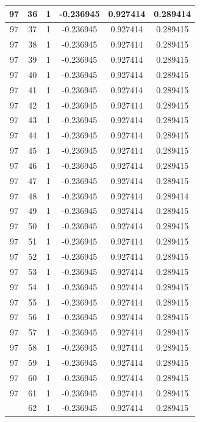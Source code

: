 \documentclass[12pt,a4paper]{article}
\numberwithin{equation}{section}
\numberwithin{figure}{section}
\numberwithin{table}{section}
\begin{document}
\begin{longtable}{|c|c|c|c|c|c|}
97 & 36 & 1 & -0.236945 & 0.927414 & 0.289414 \\ \hline
97 & 37 & 1 & -0.236945 & 0.927414 & 0.289415 \\ \hline
97 & 38 & 1 & -0.236945 & 0.927414 & 0.289415 \\ \hline
97 & 39 & 1 & -0.236945 & 0.927414 & 0.289415 \\ \hline
97 & 40 & 1 & -0.236945 & 0.927414 & 0.289415 \\ \hline
97 & 41 & 1 & -0.236945 & 0.927414 & 0.289415 \\ \hline
97 & 42 & 1 & -0.236945 & 0.927414 & 0.289415 \\ \hline
97 & 43 & 1 & -0.236945 & 0.927414 & 0.289415 \\ \hline
97 & 44 & 1 & -0.236945 & 0.927414 & 0.289415 \\ \hline
97 & 45 & 1 & -0.236945 & 0.927414 & 0.289415 \\ \hline
97 & 46 & 1 & -0.236945 & 0.927414 & 0.289415 \\ \hline
97 & 47 & 1 & -0.236945 & 0.927414 & 0.289415 \\ \hline
97 & 48 & 1 & -0.236945 & 0.927414 & 0.289414 \\ \hline
97 & 49 & 1 & -0.236945 & 0.927414 & 0.289415 \\ \hline
97 & 50 & 1 & -0.236945 & 0.927414 & 0.289415 \\ \hline
97 & 51 & 1 & -0.236945 & 0.927414 & 0.289415 \\ \hline
97 & 52 & 1 & -0.236945 & 0.927414 & 0.289415 \\ \hline
97 & 53 & 1 & -0.236945 & 0.927414 & 0.289415 \\ \hline
97 & 54 & 1 & -0.236945 & 0.927414 & 0.289415 \\ \hline
97 & 55 & 1 & -0.236945 & 0.927414 & 0.289415 \\ \hline
97 & 56 & 1 & -0.236945 & 0.927414 & 0.289415 \\ \hline
97 & 57 & 1 & -0.236945 & 0.927414 & 0.289415 \\ \hline
97 & 58 & 1 & -0.236945 & 0.927414 & 0.289415 \\ \hline
97 & 59 & 1 & -0.236945 & 0.927414 & 0.289415 \\ \hline
97 & 60 & 1 & -0.236945 & 0.927414 & 0.289415 \\ \hline
97 & 61 & 1 & -0.236945 & 0.927414 & 0.289415 \\ \hline
\pagebreak
97 & 62 & 1 & -0.236945 & 0.927414 & 0.289415 \\ \hline

\end{longtable}
\end{document}
